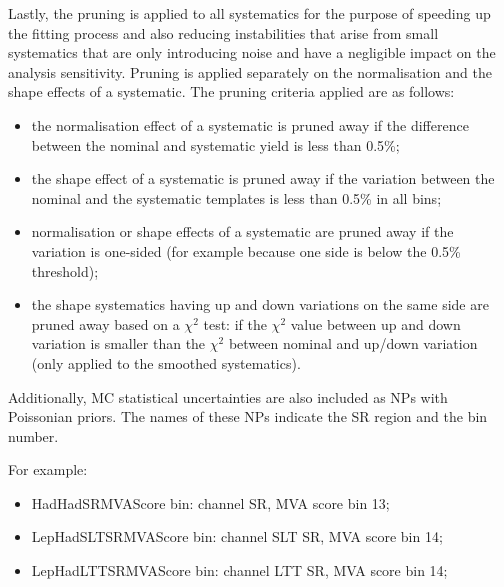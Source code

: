 Lastly, the pruning is applied to all systematics for the purpose of speeding up the fitting process and also reducing instabilities that arise from small systematics that are only introducing noise and have a negligible impact on the analysis sensitivity. Pruning is applied separately on the normalisation and the shape effects of a systematic. The pruning criteria applied are as follows:
 
 \begin{itemize}
\item the normalisation effect of a systematic is pruned away if the difference between the nominal and systematic yield is less than 0.5\%; 
\item the shape effect of a systematic is pruned away if the variation between the nominal and the systematic templates is less than 0.5\% in all bins;
\item normalisation or shape effects of a systematic are pruned away if the variation is one-sided (for example because one side is below the 0.5\% threshold);
\item the shape systematics having up and down variations on the same side are pruned away based on a $\chi^{2}$ test: if the $\chi^{2}$ value between up and down variation is smaller than the $\chi^{2}$ between nominal and up/down variation (only applied to the smoothed systematics).
\end{itemize}

Additionally, MC statistical uncertainties are also included as NPs with Poissonian priors. The names of these NPs indicate the SR region and the bin number. 

For example:

\begin{itemize}
\item HadHad\textunderscore SR\textunderscore MVAScore \textunderscore bin: \hadhad channel SR, MVA score bin 13;
\item LepHad\textunderscore SLT\textunderscore SR\textunderscore MVAScore \textunderscore bin: \lephad channel SLT SR, MVA score bin 14;
\item LepHad\textunderscore LTT\textunderscore SR\textunderscore MVAScore \textunderscore bin: \lephad channel LTT SR, MVA score bin 14;
\end{itemize}


